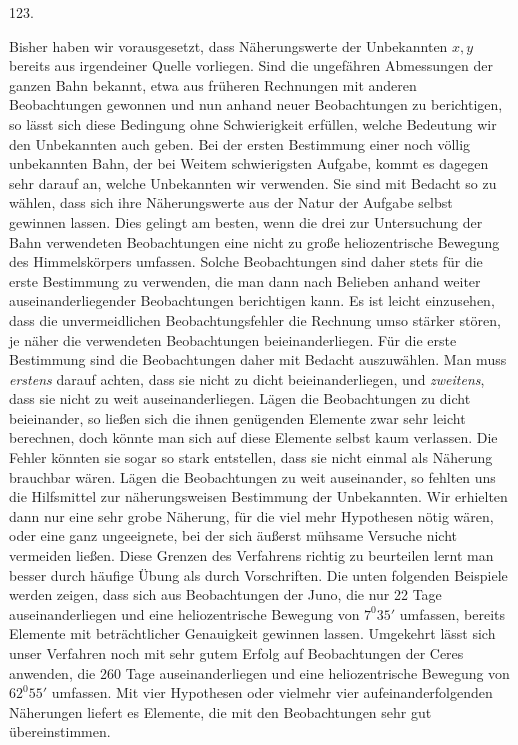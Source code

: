 \par{}\medskip
\begin{center}\hypertarget{native-170-article123}{}123.\end{center}
Bisher haben wir vorausgesetzt, dass Näherungswerte der Unbekannten $x,y$ bereits aus irgendeiner Quelle vorliegen. Sind die ungefähren Abmessungen der ganzen Bahn bekannt, etwa aus früheren Rechnungen mit anderen Beobachtungen gewonnen und nun anhand neuer Beobachtungen zu berichtigen, so lässt sich diese Bedingung ohne Schwierigkeit erfüllen, welche Bedeutung wir den Unbekannten auch geben. Bei der ersten Bestimmung einer noch völlig unbekannten Bahn, der bei Weitem schwierigsten Aufgabe, kommt es dagegen sehr darauf an, welche Unbekannten wir verwenden. Sie sind mit Bedacht so zu wählen, dass sich ihre Näherungswerte aus der Natur der Aufgabe selbst gewinnen lassen. Dies gelingt am besten, wenn die drei zur Untersuchung der Bahn verwendeten Beobachtungen eine nicht zu große heliozentrische Bewegung des Himmelskörpers umfassen. Solche Beobachtungen sind daher stets für die erste Bestimmung zu verwenden, die man dann nach Belieben anhand weiter auseinanderliegender Beobachtungen berichtigen kann. Es ist leicht einzusehen, dass die unvermeidlichen Beobachtungsfehler die Rechnung umso stärker stören, je näher die verwendeten Beobachtungen beieinanderliegen. Für die erste Bestimmung sind die Beobachtungen daher mit Bedacht auszuwählen. Man muss \emph{erstens} darauf achten, dass sie nicht zu dicht beieinanderliegen, und \emph{zweitens}, dass sie nicht zu weit auseinanderliegen. Lägen die Beobachtungen zu dicht beieinander, so ließen sich die ihnen genügenden Elemente zwar sehr leicht berechnen, doch könnte man sich auf diese Elemente selbst kaum verlassen. Die Fehler könnten sie sogar so stark entstellen, dass sie nicht einmal als Näherung brauchbar wären. Lägen die Beobachtungen zu weit auseinander, so fehlten uns die Hilfsmittel zur näherungsweisen Bestimmung der Unbekannten. Wir erhielten dann nur eine sehr grobe Näherung, für die viel mehr Hypothesen nötig wären, oder eine ganz ungeeignete, bei der sich äußerst mühsame Versuche nicht vermeiden ließen. Diese Grenzen des Verfahrens richtig zu beurteilen lernt man besser durch häufige Übung als durch Vorschriften. Die unten folgenden Beispiele werden zeigen, dass sich aus Beobachtungen der Juno, die nur 22 Tage auseinanderliegen und eine heliozentrische Bewegung von $7^0 35'$ umfassen, bereits Elemente mit beträchtlicher Genauigkeit gewinnen lassen. Umgekehrt lässt sich unser Verfahren noch mit sehr gutem Erfolg auf Beobachtungen der Ceres anwenden, die 260 Tage auseinanderliegen und eine heliozentrische Bewegung von $62^0 55'$ umfassen. Mit vier Hypothesen oder vielmehr vier aufeinanderfolgenden Näherungen liefert es Elemente, die mit den Beobachtungen sehr gut übereinstimmen.
